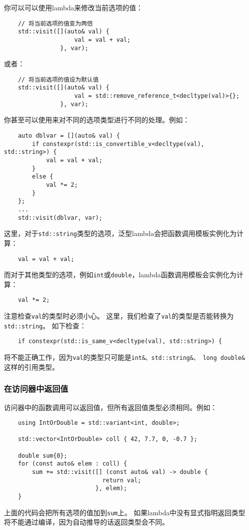 你可以可以使用lambda来修改当前选项的值：
\begin{lstlisting}
    // 将当前选项的值变为两倍
    std::visit([](auto& val) {
                    val = val + val;
                }, var);
\end{lstlisting}
或者：
\begin{lstlisting}
    // 将当前选项的值设为默认值
    std::visit([](auto& val) {
                    val = std::remove_reference_t<decltype(val)>{};
                }, var);
\end{lstlisting}
你甚至可以使用来对不同的选项类型进行不同的处理。例如：
\begin{lstlisting}
    auto dblvar = [](auto& val) {
        if constexpr(std::is_convertible_v<decltype(val), std::string>) {
            val = val + val;
        }
        else {
            val *= 2;
        }
    };
    ...
    std::visit(dblvar, var);
\end{lstlisting}
这里，对于\texttt{std::string}类型的选项，泛型lambda会把函数调用模板实例化为计算：
\begin{lstlisting}
    val = val + val;
\end{lstlisting}
而对于其他类型的选项，例如\texttt{int}或\texttt{double}，lambda函数调用模板会实例化为计算：
\begin{lstlisting}
    val *= 2;
\end{lstlisting}
注意检查\texttt{val}的类型时必须小心。
这里，我们检查了\texttt{val}的类型是否能转换为\texttt{std::string}。
如下检查：
\begin{lstlisting}
    if constexpr(std::is_same_v<decltype(val), std::string>) {
\end{lstlisting}
将不能正确工作，因为\texttt{val}的类型只可能是\texttt{int\&、std::string\&、
long double\&}这样的引用类型。

\subsubsection*{在访问器中返回值}
访问器中的函数调用可以返回值，但所有返回值类型必须相同。例如：
\begin{lstlisting}
    using IntOrDouble = std::variant<int, double>;

    std::vector<IntOrDouble> coll { 42, 7.7, 0, -0.7 };

    double sum{0};
    for (const auto& elem : coll) {
        sum += std::visit([] (const auto& val) -> double {
                            return val;
                          }, elem);
    }
\end{lstlisting}
上面的代码会把所有选项的值加到\texttt{sum}上。
如果lambda中没有显式指明返回类型将不能通过编译，因为自动推导的话返回类型会不同。

